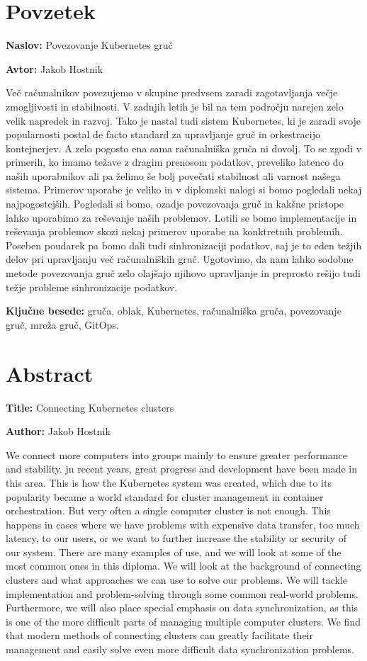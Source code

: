 \documentclass[a4paper, 12pt]{book}
\newcommand{\ttitle}{Povezovanje Kubernetes gruč}
\newcommand{\ttitleEn}{Connecting Kubernetes clusters}
\newcommand{\tauthor}{Jakob Hostnik}
\newcommand{\tkeywords}{gruča, oblak, Kubernetes, računalniška gruča, povezovanje gruč, mreža gruč, GitOps}
\newcommand{\clearemptydoublepage}{\newpage{\pagestyle{empty}\cleardoublepage}}
\begin{document}
\chapter*{Povzetek}
\noindent\textbf{Naslov:} \ttitle
\bigskip

\noindent\textbf{Avtor:} \tauthor
\bigskip
\noindent 

Več računalnikov povezujemo v skupine predvsem zaradi zagotavljanja večje zmogljivosti in stabilnosti.
V zadnjih letih je bil na tem področju narejen zelo velik napredek in razvoj.
Tako je nastal tudi sistem Kubernetes, ki je zaradi svoje popularnosti postal de facto standard za upravljanje gruč in orkestracijo kontejnerjev.
A zelo pogosto ena sama računalniška gruča ni dovolj.
To se zgodi v primerih, ko imamo težave z dragim prenosom podatkov, preveliko latenco do naših uporabnikov ali pa  želimo še bolj povečati stabilnost ali varnost našega sistema.
Primerov uporabe je veliko in v diplomski nalogi si bomo pogledali nekaj najpogostejših.
Pogledali si bomo, ozadje povezovanja gruč in kakšne pristope lahko uporabimo za reševanje naših problemov.
Lotili se bomo implementacije in reševanja problemov skozi nekaj primerov uporabe na konktretnih problemih.
Poseben poudarek pa bomo dali tudi sinhronizaciji podatkov, saj je to eden težjih delov pri upravljanju več računalniških gruč.
Ugotovimo, da nam lahko sodobne metode povezovanja gruč zelo olajšajo njihovo upravljanje in preprosto rešijo tudi težje probleme sinhronizacije podatkov.


\bigskip
\noindent\textbf{Ključne besede:} \tkeywords.
\clearemptydoublepage
\chapter*{Abstract}
\noindent\textbf{Title:} \ttitleEn
\bigskip

\noindent\textbf{Author:} \tauthor
\bigskip
\noindent 

We connect more computers into groups mainly to ensure greater performance and stability.
jn recent years, great progress and development have been made in this area.
This is how the Kubernetes system was created, which due to its popularity became a world standard for cluster management in container orchestration.
But very often a single computer cluster is not enough.
This happens in cases where we have problems with expensive data transfer, too much latency, to our users, or we want to further increase the stability or security of our system.
There are many examples of use, and we will look at some of the most common ones in this diploma.
We will look at the background of connecting clusters and what approaches we can use to solve our problems.
We will tackle implementation and problem-solving through some common real-world problems.
Furthermore, we will also place special emphasis on data synchronization, as this is one of the more difficult parts of managing multiple computer clusters.
We find that modern methods of connecting clusters can greatly facilitate their management and easily solve even more difficult data synchronization problems.
\end{document}
